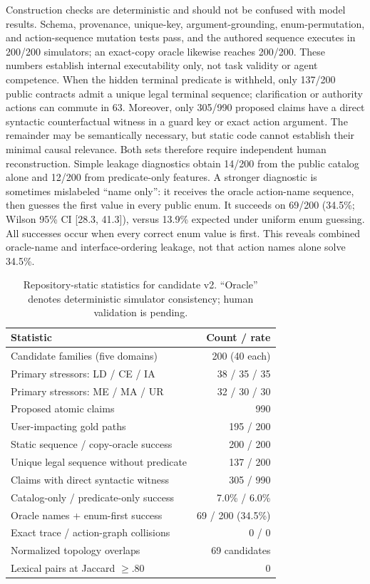 Construction checks are deterministic and should not be confused with model
results.  Schema, provenance, unique-key, argument-grounding, enum-permutation,
and action-sequence mutation tests pass, and the authored sequence executes in
200/200 simulators; an exact-copy oracle likewise reaches 200/200.  These numbers
establish internal executability only, not task validity or agent competence.
When the hidden terminal predicate is withheld, only 137/200 public contracts
admit a unique legal terminal sequence; clarification or authority actions can
commute in 63.  Moreover, only 305/990 proposed claims have a direct syntactic
counterfactual witness in a guard key or exact action argument.  The remainder
may be semantically necessary, but static code cannot establish their minimal
causal relevance.  Both sets therefore require independent human reconstruction.
Simple leakage diagnostics obtain 14/200 from the public catalog alone and 12/200
from predicate-only features.  A stronger diagnostic is sometimes mislabeled
``name only'': it receives the oracle action-name sequence, then guesses the
first value in every public enum.  It succeeds on 69/200 (34.5\%; Wilson 95\% CI
[28.3, 41.3]), versus 13.9\% expected under uniform enum guessing.  All successes
occur when every correct enum value is first.  This reveals combined oracle-name
and interface-ordering leakage, not that action names alone solve 34.5\%.

\begin{table}[t]
\centering
\small
\caption{Repository-static statistics for candidate v2. ``Oracle'' denotes
deterministic simulator consistency; human validation is pending.}
\label{tab:candidate-stats}
\begin{tabular}{@{}lr@{}}
\toprule
Statistic & Count / rate \\
\midrule
Candidate families (five domains) & 200 (40 each) \\
Primary stressors: LD / CE / IA & 38 / 35 / 35 \\
Primary stressors: ME / MA / UR & 32 / 30 / 30 \\
Proposed atomic claims & 990 \\
User-impacting gold paths & 195 / 200 \\
Static sequence / copy-oracle success & 200 / 200 \\
Unique legal sequence without predicate & 137 / 200 \\
Claims with direct syntactic witness & 305 / 990 \\
Catalog-only / predicate-only success & 7.0\% / 6.0\% \\
Oracle names + enum-first success & 69 / 200 (34.5\%) \\
Exact trace / action-graph collisions & 0 / 0 \\
Normalized topology overlaps & 69 candidates \\
Lexical pairs at Jaccard $\geq .80$ & 0 \\
\bottomrule
\end{tabular}
\end{table}

